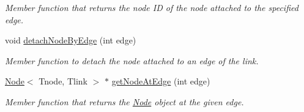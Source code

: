 \begin{DoxyCompactItemize}
\begin{DoxyCompactList}\small\item\em Member function that returns the node I\-D of the node attached to the specified edge. \end{DoxyCompactList}\item 
void \hyperlink{classLink_a847f85e9cf72ffa8f20acc3fad2f9eca}{detach\-Node\-By\-Edge} (int edge)
\begin{DoxyCompactList}\small\item\em Member function to detach the node attached to an edge of the link. \end{DoxyCompactList}\item 
\hyperlink{classNode}{Node}$<$ Tnode, Tlink $>$ $\ast$ \hyperlink{classLink_afd371e7c41ade7612eeb41cd5ec96921}{get\-Node\-At\-Edge} (int edge)
\begin{DoxyCompactList}\small\item\em Member function that returns the \hyperlink{classNode}{Node} object at the given edge. \end{DoxyCompactList}\end{DoxyCompactItemize}
